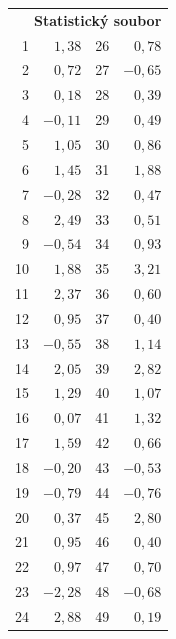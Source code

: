 \documentclass[a4paper, 11pt]{article}
\begin{document}
	\begin{table}[H]
		\begin{tabular}{r|r|r|r|}
			\multicolumn{4}{r}{\textbf{Statistický soubor}} \\[1em]
			\cline{2-2} \cline{4-4}
			1 & $ 1,38 $ & 26 & $ 0,78 $ \\ \cline{2-2} \cline{4-4}
			2 & $ 0,72 $ & 27 & $ -0,65 $ \\ \cline{2-2} \cline{4-4}
			3 & $ 0,18 $ & 28 & $ 0,39 $ \\ \cline{2-2} \cline{4-4}
			4 & $ -0,11 $ & 29 & $ 0,49 $ \\ \cline{2-2} \cline{4-4}
			5 & $ 1,05 $ & 30 & $ 0,86 $ \\ \cline{2-2} \cline{4-4}
			6 & $ 1,45 $ & 31 & $ 1,88 $ \\ \cline{2-2} \cline{4-4}
			7 & $ -0,28 $ & 32 & $ 0,47 $ \\ \cline{2-2} \cline{4-4}
			8 & $ 2,49 $ & 33 & $ 0,51 $ \\ \cline{2-2} \cline{4-4}
			9 & $ -0,54 $ & 34 & $ 0,93 $ \\ \cline{2-2} \cline{4-4}
			10 & $ 1,88 $ & 35 & $ 3,21 $ \\ \cline{2-2} \cline{4-4}
			11 & $ 2,37 $ & 36 & $ 0,60 $ \\ \cline{2-2} \cline{4-4}
			12 & $ 0,95 $ & 37 & $ 0,40 $ \\ \cline{2-2} \cline{4-4}
			13 & $ -0,55 $ & 38 & $ 1,14 $ \\ \cline{2-2} \cline{4-4}
			14 & $ 2,05 $ & 39 & $ 2,82 $ \\ \cline{2-2} \cline{4-4}
			15 & $ 1,29 $ & 40 & $ 1,07 $ \\ \cline{2-2} \cline{4-4}
			16 & $ 0,07 $ & 41 & $ 1,32 $ \\ \cline{2-2} \cline{4-4}
			17 & $ 1,59 $ & 42 & $ 0,66 $ \\ \cline{2-2} \cline{4-4}
			18 & $ -0,20 $ & 43 & $ -0,53 $ \\ \cline{2-2} \cline{4-4}
			19 & $ -0,79 $ & 44 & $ -0,76 $ \\ \cline{2-2} \cline{4-4}
			20 & $ 0,37 $ & 45 & $ 2,80 $ \\ \cline{2-2} \cline{4-4}
			21 & $ 0,95 $ & 46 & $ 0,40 $ \\ \cline{2-2} \cline{4-4}
			22 & $ 0,97 $ & 47 & $ 0,70 $ \\ \cline{2-2} \cline{4-4}
			23 & $ -2,28 $ & 48 & $ -0,68 $ \\ \cline{2-2} \cline{4-4}
			24 & $ 2,88 $ & 49 & $ 0,19 $ \\ \cline{2-2} \cline{4-4}

\end{tabular}
\end{table}
\end{document}
